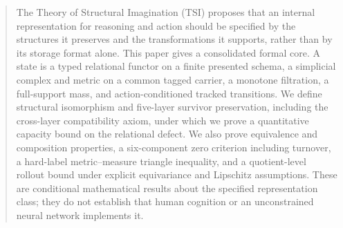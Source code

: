 \begin{abstract}
The Theory of Structural Imagination (TSI) proposes that an internal
representation for reasoning and action should be specified by the structures it
preserves and the transformations it supports, rather than by its storage format
alone. This paper gives a consolidated formal core. A state is a typed
relational functor on a finite presented schema, a simplicial complex and metric
on a common tagged carrier, a monotone filtration, a full-support mass, and
action-conditioned tracked transitions. We define structural isomorphism and
five-layer survivor preservation, including the cross-layer compatibility axiom,
under which we prove a quantitative capacity bound on the relational defect. We
also prove equivalence and composition properties, a six-component zero criterion
including turnover, a hard-label metric--measure triangle inequality, and a
quotient-level rollout bound under explicit equivariance and Lipschitz assumptions. These are
conditional mathematical results about the specified representation class; they
do not establish that human cognition or an unconstrained neural network
implements it.
\end{abstract}
